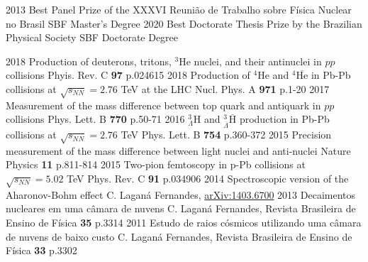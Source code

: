 \documentclass[9pt]{developercv} %
\begin{document}

\vspace{-10 pt}
\begin{entrylist}
    \entry
		{2013}
		{Best Panel Prize of the XXXVI Reunião de Trabalho sobre Física Nuclear no Brasil}
		{SBF}
		{Master's Degree}
	\entry
		{2020}
		{Best Doctorate Thesis Prize by the Brazilian Physical Society}
		{SBF}
		{Doctorate Degree}
\end{entrylist}


\vspace{-10 pt}
\begin{entrylist}
	\entry
        {2018}
		{Production of deuterons, tritons, $^3$He nuclei, and their antinuclei in $pp$ collisions}
		{}
		{Phyis. Rev. C {\bf 97} p.024615}
	\entry
        {2018}
		{Production of $^4$He and $^4\overline{\mbox{He}}$ in Pb-Pb collisions at $\sqrt{s_{NN}}=2.76$ TeV at the LHC}
		{}
		{Nucl. Phys. A {\bf 971} p.1-20}
	\entry
        {2017}
		{Measurement of the mass difference between top quark and antiquark in $pp$ collisions}
		{}
		{Phys. Lett. B {\bf 770} p.50-71}
	\entry
        {2016}
		{$^3_\Lambda$H and $^3_{\overline{\Lambda}}\overline{\mbox{H}}$ production in Pb-Pb collisions at $\sqrt{s_{NN}}=2.76$ TeV}
		{}
		{Phys. Lett. B {\bf 754} p.360-372}
	\entry
        {2015}
		{Precision measurement of the mass difference between light nuclei and anti-nuclei}
		{}
		{Nature Physics {\bf 11} p.811-814}
	\entry
        {2015}
		{Two-pion femtoscopy in p-Pb collisions at $\sqrt{s_{NN}}=5.02$ TeV}
		{}
		{Phys. Rev. C {\bf 91} p.034906}
	\entry
		{2014}
		{Spectroscopic version of the Aharonov-Bohm effect}
		{}
		{C. Laganá Fernandes, \href{https://arxiv.org/abs/1403.6700}{arXiv:1403.6700}}
	\entry
        {2013}
		{Decaimentos nucleares em uma câmara de nuvens}
		{}
		{C. Laganá Fernandes, Revista Brasileira de Ensino de Física {\bf 35} p.3314}
	\entry
        {2011}
		{Estudo de raios cósmicos utilizando uma câmara de nuvens de baixo custo}
		{}
		{C. Laganá Fernandes, Revista Brasileira de Ensino de Física {\bf 33} p.3302}
	\end{entrylist}
\end{document}
